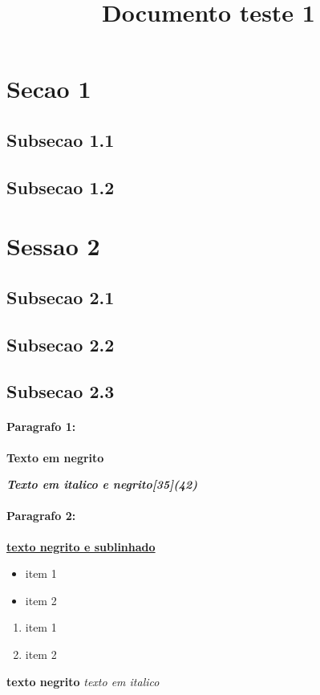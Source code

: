\documentclass{article}
\title{Documento teste 1}
\begin{document}
\section{Secao 1}

\subsection{Subsecao 1.1}

\subsection{Subsecao 1.2}

\section{Sessao 2}

\subsection{Subsecao 2.1}

\subsection{Subsecao 2.2}

\subsection{Subsecao 2.3}

\paragraph{Paragrafo 1:}

\bf{Texto em negrito}	

\em{\bf{Texto em italico e negrito[35](42)}}


\paragraph{Paragrafo 2:}

\underline{\bf{texto negrito e sublinhado}}

\begin{itemize}
\item item 1
\item item 2
\end{itemize}

\begin{enumerate}
\item item 1
\item item 2
\end{enumerate}

{\bf texto negrito}
{\it texto em italico}
\end{document}
